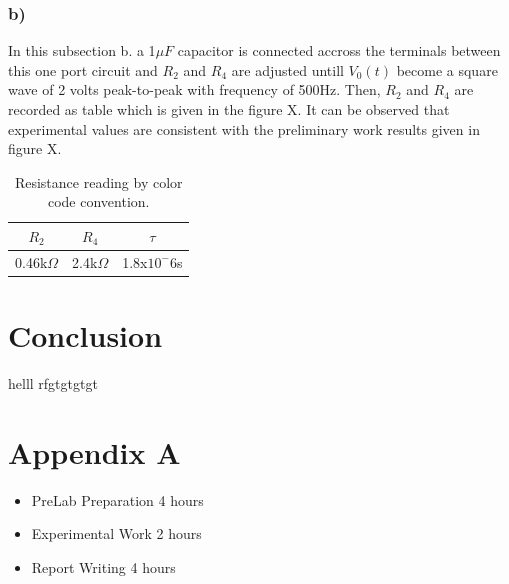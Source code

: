 \documentclass[letterpaper,12pt]{article}
\begin{document}
\subsubsection{b)}
In this subsection b. a 1\(\mu F\) capacitor is connected accross the terminals between this one port circuit and \(R_2 \) and \(R_4 \) are adjusted untill \(V_0(t)\) become a square wave of 2 volts peak-to-peak with frequency of 500Hz. Then, \(R_2 \) and \(R_4 \) are recorded as table which is given in the figure X. It can be observed that experimental values are consistent with the preliminary work results given in figure X.


\begin{table}[H]
    \begin{center}
        \caption{Resistance reading by color code convention.}
        \vspace{2mm}
        \begin{tabular}{||c | c | c ||} 
            \hline
            \(R_2\) & \(R_4\) &  \(\tau \) \\ [0.5ex] 
            \hline\hline
            0.46k\(\Omega\) & 2.4k\(\Omega\) &  1.8x\(10^-6\)s \\
            \hline
        \end{tabular}
    \end{center}
\end{table}

\section{Conclusion}

helll
rfgtgtgtgt
\section*{Appendix A}
\begin{itemize}
    \item PreLab Preparation 4 hours
    \item Experimental Work 2  hours
    \item Report Writing 4 hours
\end{itemize}
\end{document}
